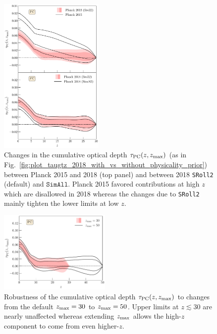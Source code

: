 \documentclass[prd,twocolumn,amsmath,amssymb,floatfix,superscriptaddress,nofootinbib]{revtex4-1}
\newcommand{\zmax}{z_{\rm max}}
\newcommand{\wh}[1]{\textcolor{blue}{#1}}
\newcommand{\ch}[1]{\textcolor{red}{#1}}
\begin{document}
{\begin{figure}[ht]
\includegraphics[width=0.45\textwidth]{paper/plots/pl18_taugtz_pc_zmax30_pl15_vs_pl18_simallEE_vs_pl18_srollv2_do_rescale_tau_false.pdf}
\caption{Changes in the
cumulative optical depth $\tau_{\rm PC}(z, \zmax)$ (as in Fig.~\ref{fig:plot_taugtz_2018_with_vs_without_physicality_prior}) 
between Planck 2015 and 2018 (top panel) and between 2018 \texttt{SRoll2} (default) and $\texttt{SimAll}$.  Planck 2015 favored contributions at high $z$ which are disallowed in 2018 whereas the changes due to \texttt{SRoll2} mainly tighten the lower limits at low $z$.
}
\label{fig:plot_taugtz_2015_vs_2018_simallEE_vs_2018_srollv2}
\end{figure}


\begin{figure}[ht]
\includegraphics[width=0.48\textwidth]{paper/plots/pl18_taugtz_pl18_srollv2_pc_zmax30_vs_zmax50_do_rescale_tau_false.pdf}
\caption{Robustness of the 
cumulative optical depth $\tau_{\rm PC}(z, \zmax)$ to changes from the default $\zmax = 30$ to $\zmax = 50$. Upper limits at $z \lesssim 30$ are nearly unaffected whereas extending $\zmax$ allows the high-$z$ component to come from even higher-$z$.
}
\label{fig:plot_taugtz_zmax30_vs_zmax50}
\end{figure}


}
\end{document}
